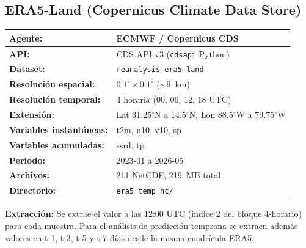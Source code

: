 \documentclass[12pt]{article}
\newlength{\descrwidth}
\begin{document}
\subsection{ERA5-Land (Copernicus Climate Data Store)}
\begin{tabular}{P{\descrwidth} P{\dimexpr\textwidth-\tabcolsep\relax}}
\toprule
\textbf{Agente:} & ECMWF / Copernicus CDS \\
\midrule
\textbf{API:} & CDS API v3 (\texttt{cdsapi} Python) \\
\midrule
\textbf{Dataset:} & \texttt{reanalysis-era5-land} \\
\midrule
\textbf{Resoluci\'on espacial:} & $0.1^\circ \times 0.1^\circ$ ($\sim$9~km) \\
\midrule
\textbf{Resoluci\'on temporal:} & 4 horaria (00, 06, 12, 18 UTC) \\
\midrule
\textbf{Extensi\'on:} & Lat 31.25$^\circ$N a 14.5$^\circ$N, Lon 88.5$^\circ$W a 79.75$^\circ$W \\
\midrule
\textbf{Variables instant\'aneas:} & t2m, u10, v10, sp \\
\midrule
\textbf{Variables acumuladas:} & ssrd, tp \\
\midrule
\textbf{Periodo:} & 2023-01 a 2026-05 \\
\midrule
\textbf{Archivos:} & 211 NetCDF, 219~MB total \\
\midrule
\textbf{Directorio:} & \texttt{era5\_temp\_nc/} \\
\bottomrule
\end{tabular}

\textbf{Extracci\'on:} Se extrae el valor a las 12:00 UTC (\'indice 2 del bloque 4-horario) para cada muestra. Para el an\'alisis de predicci\'on temprana se extraen adem\'as valores en t-1, t-3, t-5 y t-7 d\'ias desde la misma cuadr\'icula ERA5.
\end{document}
